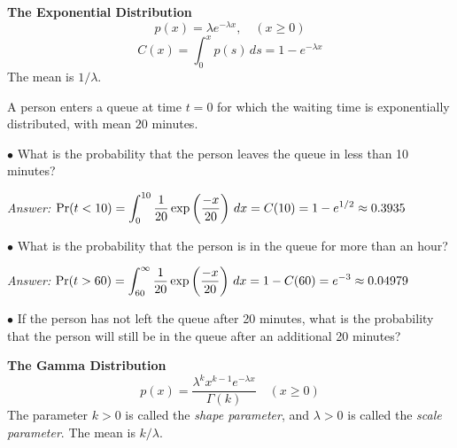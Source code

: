 \medskip
\noindent
\textbf{The Exponential Distribution}
\begin{equation}
 p(x) = \lambda e^{-\lambda x}, \quad (x \ge 0)
\end{equation}
\begin{equation}
  C(x) = \int_0^x p(s)\,ds =  1 - e^{-\lambda x}
\end{equation}
The mean is $1/\lambda$.
\begin{xexample}
A person enters a queue at time $t=0$ for which the
waiting time is exponentially distributed, with mean $20$ minutes.

\noindent
$\bullet$
 What is the probability that the person leaves the
queue in less than 10 minutes?

\noindent
\emph{Answer:} $\displaystyle \Pr(t < 10) =\int_0^{10} \frac{1}{20} \exp\left(\frac{-x}{20}\right)\,dx
     = C(10) = 1-e^{1/2} \approx 0.3935$

\noindent
$\bullet$
What is the probability that the person is in the queue for
more than an hour?

\noindent
\emph{Answer:} $\displaystyle \Pr(t > 60) = \int_{60}^{\infty} \frac{1}{20} \exp\left(\frac{-x}{20}\right)\,dx
     = 1-C(60) = e^{-3} \approx 0.04979$

\noindent
$\bullet$
If the person has not left the queue after 20 minutes, what is the
probability that the person will still be in the queue after an additional
20 minutes?
\label{ex:exp_example}
\end{xexample}
%
%
\noindent
\medskip
\textbf{The Gamma Distribution}
\begin{equation}
  p(x) = \frac{\lambda^{k} x^{k-1} e^{-\lambda x}}{\Gamma(k)}
   \quad (x \ge 0)
\end{equation}
The parameter $k>0$ is called the \emph{shape parameter},
and $\lambda > 0$ is called the \emph{scale parameter}.
The mean is $k/\lambda$.

